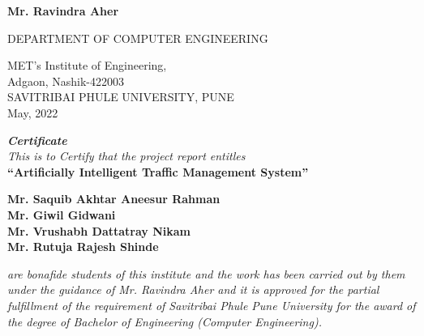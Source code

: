 \documentclass[openany,12pt]{report}
\begin{document}
\begin{titlepage}
\begin{center}
			{\bf Mr. Ravindra Aher}\\
			\vspace{0.4in}
			
			
			{\small DEPARTMENT OF COMPUTER ENGINEERING}\\
			\begin{figure}[h]
				\centerline{}
				\label{atcres}
			\end{figure}
			{\large MET's Institute of Engineering,}\\
			{\small Adgaon, Nashik-422003}\\
			SAVITRIBAI PHULE UNIVERSITY, PUNE\\
			\vspace{0.2in}
			{\small May, 2022}
		\end{center}
	\end{titlepage}
	
	\fontsize{14}{16}
	\thispagestyle{empty}
	\begin{center}
		\begin{figure}[h]
			\centerline{}
			\label{atcres}
		\end{figure}
		\vspace{0.1in}
		{\it \Huge  \textbf{Certificate}}
		\vspace{0.2in}\\
		{\it This is to Certify that the project report entitles}\\
		\vspace{0.2in}
		{\Large \bf ``Artificially Intelligent Traffic Management System''}\\
		\vspace{0.2in}
		
		{\bf Mr. Saquib Akhtar Aneesur Rahman}\hspace*{\fill}{\bf (Exam Seat No. B150474298)}\\
		{\bf Mr. Giwil Gidwani}\hspace*{\fill}{\bf (Exam Seat No. B150474245)}\\
		{\bf Mr. Vrushabh Dattatray Nikam}\hspace*{\fill}{\bf (Exam Seat No. B150474278)}\\
		{\bf Mr. Rutuja Rajesh Shinde}\hspace*{\fill}{\bf (Exam Seat No. B150474304)}\\
	\end{center}
	\vspace{0.3in}
	{\it are bonafide students of this institute and the work has been carried out by them under
		the guidance of Mr. Ravindra Aher and it is approved for the partial fulfillment of the
		requirement of Savitribai Phule Pune University for the award of the degree of Bachelor
		of Engineering (Computer Engineering).}\\
	\vspace{0.2in}
	\vspace{0.7in}
	\noindent
	
\end{document}
